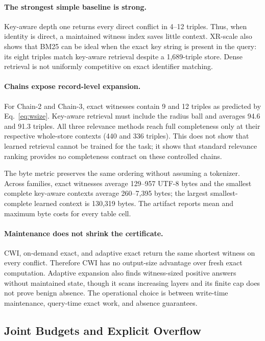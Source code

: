 \documentclass[letterpaper]{article} %
\newcommand{\cwi}{\textsc{CWI}}
\begin{document}
\paragraph{The strongest simple baseline is strong.}
Key-aware depth one returns every direct conflict in 4--12 triples.  Thus,
when identity is direct, a maintained witness index saves little context.
XR-scale also shows that BM25 can be ideal when the exact key string is present
in the query: its eight triples match key-aware retrieval despite a
1,689-triple store.  Dense retrieval is not uniformly competitive on exact
identifier matching.

\paragraph{Chains expose record-level expansion.}
For Chain-2 and Chain-3, exact witnesses contain 9 and 12 triples as predicted
by Eq.~\ref{eq:wsize}.  Key-aware retrieval must include the radius ball and
averages 94.6 and 91.3 triples.  All three relevance methods reach full
completeness only at their respective whole-store contexts (440 and 336
triples).  This does not show that learned retrieval cannot be trained for the
task; it shows that standard relevance ranking provides no completeness
contract on these controlled chains.

The byte metric preserves the same ordering without assuming a tokenizer.
Across families, exact witnesses average 129--957 UTF-8 bytes and the smallest
complete key-aware contexts average 260--7,395 bytes; the largest smallest-
complete learned context is 130,319 bytes.  The artifact reports mean and
maximum byte costs for every table cell.

\paragraph{Maintenance does not shrink the certificate.}
\cwi{}, on-demand exact, and adaptive exact return the same shortest witness
on every conflict.  Therefore \cwi{} has no output-size advantage over fresh
exact computation.  Adaptive expansion also finds witness-sized positive
answers without maintained state, though it scans increasing layers and its
finite cap does not prove benign absence.  The operational choice is between
write-time maintenance, query-time exact work, and absence guarantees.

\subsection{Joint Budgets and Explicit Overflow}
\end{document}
